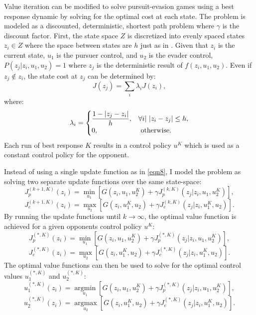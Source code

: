 Value iteration can be modified to solve pursuit-evasion games using a best response dynamic by solving for the optimal cost at each state. The problem is modeled as a discounted, deterministic, shortest path problem where $\gamma$ is the discount factor. First, the state space $Z$ is discretized into evenly spaced states $z_i \in Z$ where the space between states are $h$ just as in \cite{bardi2}. Given that $z_i$ is the current state, $u_1$ is the pursuer control, and $u_2$ is the evader control, $P(z_j|z_i,u_1,u_2) = 1$ where $z_j$ is the deterministic result of $f(z_i,u_1,u_2)$. Even if $z_j \notin z_i$, the state cost at $z_j$ can be determined by:
\begin{equation}\label{concomb}
J(z_j)  =  \sum_i\lambda_iJ(z_i),
\end{equation}
where:
\begin{equation}\label{lamb}
\lambda_i = 
\begin{cases}
\dfrac{1-|z_j-z_i|}{h}, & \forall i |\textnormal{ } |z_i-z_j|\leq h,\\
0, & \textnormal{ otherwise}.
\end{cases}
\end{equation} 
Each run of best response $K$ results in a control policy $u^K$ which is used as a constant control policy for the opponent. 

Instead of using a single update function as in \ref{eqn8}, I model the problem as solving two separate update functions over the same state-space:
\begin{equation}\label{pbell}
J_p^{(k+1,K)}(z_i)= \underset{u_1 }{\operatorname{min }}[G(z_i,u_1,u_2^K)+\gamma J_p^{(k,K)}(z_j|z_i,u_1,u_2^K)],
\end{equation}
\begin{equation}\label{ebell}
J_e^{(k+1,K)}(z_i)= \underset{u_2 }{\operatorname{max }}[G(z_i,u_1^K,u_2)+\gamma J_e^{(k,K)}(z_j|z_i,u_1^K,u_2)].
\end{equation} 
By running the update functions until $k \rightarrow \infty$, the optimal value function is achieved for a given opponents control policy $u^K$:
\begin{equation}\label{popt}
J_p^{(*,K)}(z_i)= \underset{u_1 }{\operatorname{min }}[G(z_i,u_1,u_2^K)+\gamma J_p^{(*,K)}(z_j|z_i,u_1,u_2^K)],
\end{equation}
\begin{equation}\label{eopt}
J_e^{(*,K)}(z_i)= \underset{u_2 }{\operatorname{max }}[G(z_i,u_1^K,u_2)+\gamma J_e^{(*,K)}(z_j|z_i,u_1^K,u_2)].
\end{equation}
The optimal value functions can then be used to solve for the optimal control values $u_1^{(*,K)}$ and $u_2^{(*,K)}$:
\begin{equation}\label{pcont}
u_1^{(*,K)}(z_i)= \underset{u_1 }{\operatorname{arg min }}[G(z_i,u_1,u_2^K)+\gamma J_p^{(*,K)}(z_j|z_i,u_1,u_2^K)],
\end{equation}
\begin{equation}\label{econt}
u_2^{(*,K)}(z_i)= \underset{u_2 }{\operatorname{arg max }}[G(z_i,u_1^K,u_2)+\gamma J_e^{(*,K)}(z_j|z_i,u_1^K,u_2)].
\end{equation}  

